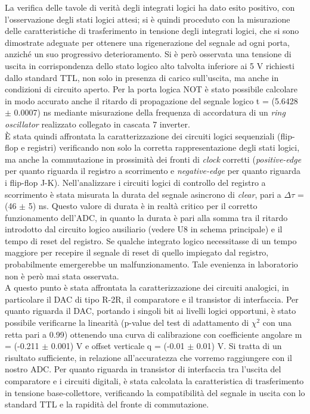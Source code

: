 \documentclass[journal]{IEEEtran}
\begin{document}
La verifica delle tavole di verità degli integrati logici ha dato esito positivo, con l'osservazione degli stati logici attesi; si è quindi proceduto con la misurazione delle caratteristiche di trasferimento in tensione degli integrati logici, che si sono dimostrate adeguate per ottenere una rigenerazione del segnale ad ogni porta, anziché un suo progressivo deterioramento. Si è però osservata una tensione di uscita in corrispondenza dello stato logico alto talvolta inferiore ai 5 V richiesti dallo standard TTL, non solo in presenza di carico sull'uscita, ma anche in condizioni di circuito aperto. Per la porta logica NOT è stato possibile calcolare in modo accurato anche il ritardo di propagazione del segnale logico t = (5.6428 $\pm$ 0.0007) ns mediante misurazione della frequenza di accordatura di un \textit{ring oscillator} realizzato collegato in cascata 7 inverter.
\\

È stata quindi affrontata la caratterizzazione dei circuiti logici sequenziali (flip-flop e registri) verificando non solo la corretta rappresentazione degli stati logici, ma anche la commutazione in prossimità dei fronti di \textit{clock} corretti (\textit{positive-edge} per quanto riguarda il registro a scorrimento e \textit{negative-edge} per quanto riguarda i flip-flop J-K). Nell'analizzare i circuiti logici di controllo del registro a scorrimento è stata misurata la durata del segnale asincrono di \textit{clear}, pari a $\Delta\tau$ = (46 $\pm$ 5) ns. Questo valore di durata è in realtà critico per il corretto funzionamento dell'ADC, in quanto la durata è pari alla somma tra il ritardo introdotto dal circuito logico ausiliario (vedere U8 in schema principale) e il tempo di reset del registro. Se qualche integrato logico necessitasse di un tempo maggiore per recepire il segnale di reset di quello impiegato dal registro, probabilmente emergerebbe un malfunzionamento. Tale evenienza in laboratorio non è però mai stata osservata.
\\

A questo punto è stata affrontata la caratterizzazione dei circuiti analogici, in particolare il DAC di tipo R-2R, il comparatore e il transistor di interfaccia. Per quanto riguarda il DAC, portando i singoli bit ai livelli logici opportuni, è stato possibile verificarne la linearità (p-value del test di adattamento di $\chi^2$ con una retta pari a 0.99) ottenendo una curva di calibrazione con coefficiente angolare m = (-0.211 $\pm$ 0.001) V e offset verticale q = (-0.01 $\pm$ 0.01) V. Si tratta di un risultato sufficiente, in relazione all'accuratezza che vorremo raggiungere con il nostro ADC. Per quanto riguarda in transistor di interfaccia tra l'uscita del comparatore e i circuiti digitali, è stata calcolata la caratteristica di trasferimento in tensione base-collettore, verificando la compatibilità del segnale in uscita con lo standard TTL e la rapidità del fronte di commutazione. 
\\
\end{document}
